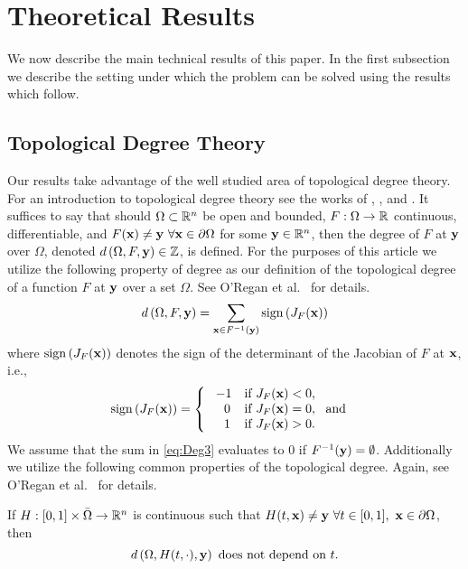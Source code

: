 \section{Theoretical Results} \label{sec:theory}  
We now describe the main technical results of this paper. 
In the first subsection we describe the setting under which the problem can be solved using the results which follow. 
\subsection{Topological Degree Theory}
Our results take advantage of the well studied area of topological degree theory. 
For an introduction to topological degree theory see the works of \cite{fonseca1995degree}, \cite{MoVrYa2002}, and \cite{OrChCh2006}.
It suffices to say that should $\Omega\subset\mathbb{R}^{n}$ be open and bounded, $F:\Omega\rightarrow \mathbb{R}$ continuous, differentiable, and $F(\mathbf{x}) \neq \mathbf{y}~\forall \mathbf{x}\in\partial\Omega$ for some $\mathbf{y}\in\mathbb{R}^n$, then the degree of $F$ at $\mathbf{y}$ over $\Omega$, denoted $d\left(\Omega,F,\mathbf{y}\right)\in\mathbb{Z}$, is defined. 
For the purposes of this article we utilize the following property of degree as our definition of the topological degree of a function $F$ at $\mathbf{y}$ over a set $\Omega$. 
See O'Regan et al.~\cite{OrChCh2006} for details.
\begin{equation}\label{eq:Deg3}
  d\left(\Omega,F,\mathbf{y}\right)=\sum\limits_{\mathbf{x}\in F^{-1}(\mathbf{y})}\operatorname{sign}\left(J_F(\mathbf{x})\right)
\end{equation}
%
where $\operatorname{sign}\left(J_F(\mathbf{x})\right)$ denotes the sign of the determinant of the Jacobian of $F$ at $\mathbf{x}$, i.e.,
%
\[\operatorname{sign}\left(J_F(\mathbf{x})\right)=   \left\{
\begin{array}{ll}
       \ -1   & \mbox{if } J_F(\mathbf{x})< 0, \\
      \quad 0 & \mbox{if } J_F(\mathbf{x})= 0,~\mbox{ and } \\
      \quad 1 & \mbox{if } J_F(\mathbf{x})> 0. \\
\end{array} 
\right. \]
%
We assume that the sum in \cref{eq:Deg3} evaluates to $0$ if $F^{-1}(\mathbf{y}) = \emptyset$.
Additionally we utilize the following common properties of the topological degree. 
Again, see O'Regan et al.~\cite{OrChCh2006} for details. 

If $H : [0,1]\times\bar{\Omega}\rightarrow\mathbb{R}^n$ is continuous such that $H(t,\mathbf{x})\neq \mathbf{y}~\forall t\in[0,1],~\mathbf{x}\in\partial\Omega$,  then 
\begin{equation}\label{eq:Deg1} 
  d\left(\Omega,H(t,\cdot),\mathbf{y}\right)\text{ does not depend on }t.
\end{equation}

